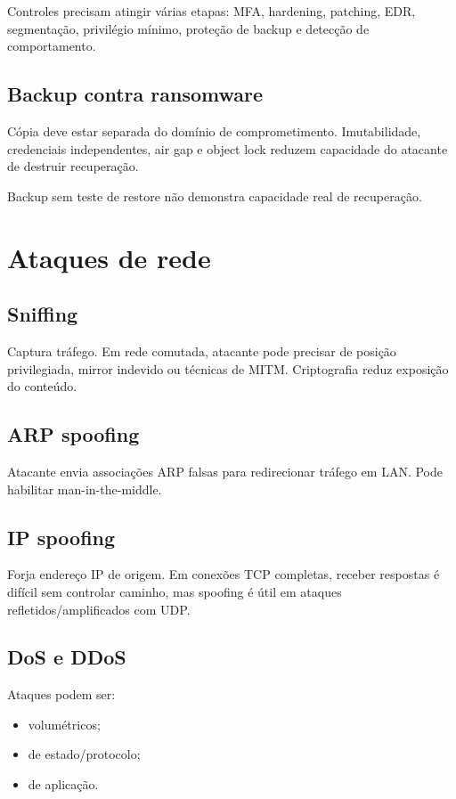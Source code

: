 Controles precisam atingir várias etapas: MFA, hardening, patching, EDR, segmentação, privilégio mínimo, proteção de backup e detecção de comportamento.

\subsection{Backup contra ransomware}

Cópia deve estar separada do domínio de comprometimento. Imutabilidade, credenciais independentes, air gap e object lock reduzem capacidade do atacante de destruir recuperação.

Backup sem teste de restore não demonstra capacidade real de recuperação.

\section{Ataques de rede}

\subsection{Sniffing}

Captura tráfego. Em rede comutada, atacante pode precisar de posição privilegiada, mirror indevido ou técnicas de MITM. Criptografia reduz exposição do conteúdo.

\subsection{ARP spoofing}

Atacante envia associações ARP falsas para redirecionar tráfego em LAN. Pode habilitar man-in-the-middle.

\subsection{IP spoofing}

Forja endereço IP de origem. Em conexões TCP completas, receber respostas é difícil sem controlar caminho, mas spoofing é útil em ataques refletidos/amplificados com UDP.

\subsection{DoS e DDoS}

Ataques podem ser:
\begin{itemize}
\item volumétricos;
\item de estado/protocolo;
\item de aplicação.
\end{itemize}

